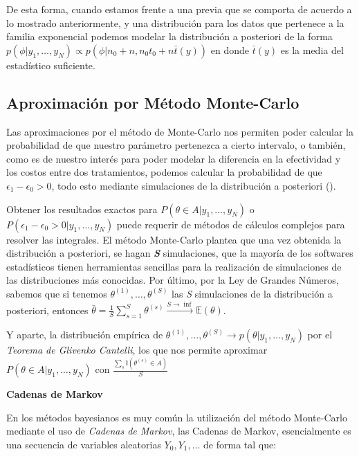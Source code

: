 \documentclass[12pt]{article}
\begin{document}
De esta forma, cuando estamos frente a una previa que se comporta de acuerdo a lo mostrado anteriormente, y una distribución para los datos que pertenece a la familia exponencial podemos modelar la distribución a posteriori de la forma $p(\phi|y_1,\ldots,y_N) \propto p(\phi|n_0+n,n_0t_0+n\bar{t}(y))$ en donde $\bar{t}(y)$ es la media del estadístico suficiente.

\subsection{Aproximación por Método Monte-Carlo}

Las aproximaciones por el método de Monte-Carlo nos permiten poder calcular la probabilidad de que nuestro parámetro pertenezca a cierto intervalo, o también, como es de nuestro interés para poder modelar la diferencia en la efectividad y los costos entre dos tratamientos, podemos calcular la probabilidad de que $\epsilon_1-\epsilon_0>0$, todo esto mediante simulaciones de la distribución a posteriori (\cite{hoff_first_2009}).
\

Obtener los resultados exactos para $P(\theta \in A|y_1,\ldots,y_N)$ o $P(\epsilon_1-\epsilon_0>0|y_1,\ldots,y_N)$ puede requerir de métodos de cálculos complejos para resolver las integrales. El método Monte-Carlo plantea que una vez obtenida la distribución a posteriori, se hagan \textbf{\textit{S}} simulaciones, que la mayoría de los softwares estadísticos tienen herramientas sencillas para la realización de simulaciones de las distribuciones más conocidas. Por último, por la Ley de Grandes Números, sabemos que si tenemos $\theta^{(1)},\ldots,\theta^{(S)}$ las \textit{S} simulaciones de la distribución a posteriori, entonces $\bar{\theta}=\frac{1}{S}\sum_{s=1}^S\theta^{(s)} \xrightarrow{S \rightarrow \inf} \mathbb{E}(\theta)$.
\

Y aparte, la distribución empírica de $\theta^{(1)},\ldots,\theta^{(S)} \rightarrow p(\theta|y_1,\ldots,y_N)$ por el \textit{Teorema de Glivenko Cantelli}, los que nos permite aproximar $P(\theta \in A|y_1,\ldots,y_N)$ con $\frac{\sum_s \mathbb{I}(\theta^{(s)} \in A)}{S}$\\

\begin{center}
	\textbf{Cadenas de Markov}
\end{center}

En los métodos bayesianos es muy común la utilización del método Monte-Carlo mediante el uso de \textit{Cadenas de Markov}, las Cadenas de Markov, esencialmente es una secuencia de variables aleatorias $Y_0, Y_1,\ldots$ de forma tal que:\\
\end{document}
